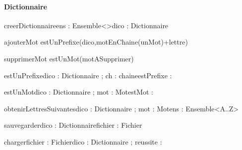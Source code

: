 \paragraph{Dictionnaire}
\begin{algorithme}
  
  \signaturefonction
  {creerDictionnaire}{ens : Ensemble<\chaine>}{dico : Dictionnaire}
  
  \signatureProcedure
  {ajouterMot}{ }{estUnPrefixe(dico,motEnChaine(unMot)+lettre)}
  
  \signatureProcedureAvecPreconditions 
  {supprimerMot}{ }{estUnMot(motASupprimer)}

  \signaturefonction
  {estUnPrefixe}{dico : Dictionnaire ; ch : chaine}{estPrefixe : \booleen}
  
  \signaturefonction
  {estUnMot}{dico : Dictionnaire ; mot : Mot}{estMot : \booleen}
  
  \signaturefonction
  {obtenirLettresSuivantes}{dico : Dictionnaire ; mot : Mot}{ens : Ensemble<A..Z>}
  
  \signaturefonction
  {sauvegarder}{dico : Dictionnaire}{fichier : Fichier}	
  
  \signaturefonction
  {charger}{fichier : Fichier}{dico : Dictionnaire ; reussite : \booleen}
  
\end{algorithme}


